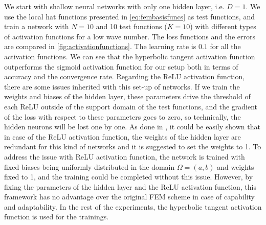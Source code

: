 We start with shallow neural networks with only one hidden layer, i.e. $D=1$. We use the local hat functions presented in \eqref{eq:fembasisfuncs} as test functions, and train a network with $N=10$ and 10 test functions ($K=10$) with different types of activation functions for a low wave number. The loss functions and the errors are compared in \autoref{fig:activationfunctions}. The learning rate is $0.1$ for all the activation functions. We can see that the hyperbolic tangent activation function outperforms the sigmoid activation function for our setup both in terms of accuracy and the convergence rate. Regarding the ReLU activation function, there are some issues inherited with this set-up of networks. If we train the weights and biases of the hidden layer, these parameters drive the threshold of each ReLU outside of the support domain of the test functions, and the gradient of the loss with respect to these parameters goes to zero, so technically, the hidden neurons will be lost one by one. As done in \cite{liu2021}, it could be easily shown that in case of the ReLU activation function, the weights of the hidden layer are redundant for this kind of networks and it is suggested to set the weights to 1. To address the issue with ReLU activation function, the network is trained with fixed biases being uniformly distributed in the domain $\Omega=(a, b)$ and weights fixed to 1, and the training could be completed without this issue. However, by fixing the parameters of the hidden layer and the ReLU activation function, this framework has no advantage over the original FEM scheme in case of capability and adaptability. In the rest of the experiments, the hyperbolic tangent activation function is used for the trainings.

